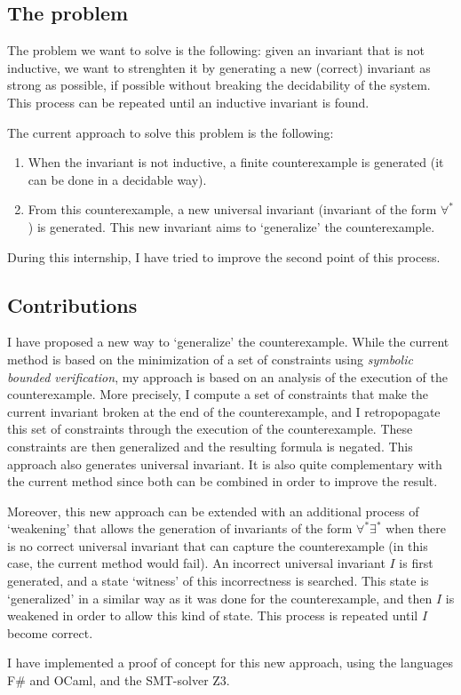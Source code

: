 \documentclass{article}
\newenvironment{point}[1]%
{\subsection*{#1}}%
{}
\begin{document}
\begin{point}{The problem}
  
  The problem we want to solve is the following:
  given an invariant that is not inductive, we want to strenghten it by generating a new (correct) invariant as strong as possible,
  if possible without breaking the decidability of the system.
  This process can be repeated until an inductive invariant is found.

  The current approach to solve this problem is the following:
  \begin{enumerate}
    \item When the invariant is not inductive, a finite counterexample is generated (it can be done in a decidable way).
    \item From this counterexample, a new universal invariant (invariant of the form \(\forall^*\)) is generated. This new invariant aims to `generalize' the counterexample.
  \end{enumerate}
  
  During this internship, I have tried to improve the second point of this process.

\end{point}

\begin{point}{Contributions}

  I have proposed a new way to `generalize' the counterexample. While the current method is based on the
  minimization of a set of constraints using \textit{symbolic bounded verification},
  my approach is based on an analysis of the execution of the counterexample.
  More precisely, I compute a set of constraints that make the current invariant broken at the end of the counterexample,
  and I retropopagate this set of constraints through the execution of the counterexample.
  These constraints are then generalized and the resulting formula is negated.
  This approach also generates universal invariant. It is also quite complementary with the current method
  since both can be combined in order to improve the result.

  Moreover, this new approach can be extended with an additional process of `weakening' that
  allows the generation of invariants of the form \(\forall^*\exists^*\) when there is no
  correct universal invariant that can capture the counterexample (in this case, the current method would fail).
  An incorrect universal invariant \(I\) is first generated, and a state `witness' of this incorrectness is searched.
  This state is `generalized' in a similar way as it was done for the counterexample, and then \(I\)
  is weakened in order to allow this kind of state. This process is repeated until \(I\) become correct.

  I have implemented a proof of concept for this new approach, using the languages F\# and OCaml, and the SMT-solver Z3.
 
\end{point}
\end{document}
